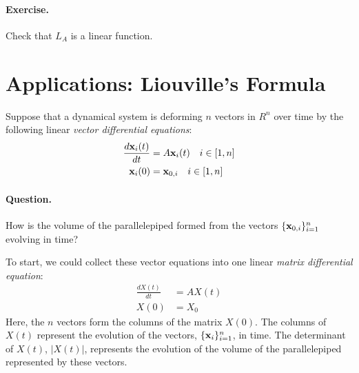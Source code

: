 \documentclass{article}
\begin{document}
\paragraph{Exercise.} Check that $L_A$ is a linear function.

\section{Applications: Liouville's Formula}
Suppose that a dynamical system is deforming $n$ vectors in $R^n$ over time by
the following linear {\em vector differential equations\/}:
\begin{align}
  \frac{d {\bf x}_i(t)}{dt} &= A {\bf x}_i(t) \quad i \in [1, n] \label{deq_v}\\
    {\bf x}_i(0) &= {\bf x}_{0,i} \quad i \in [1,n]
\end{align}

\paragraph{Question.} How is the volume of the parallelepiped formed from the vectors $\{{\bf x}_{0,i}\}_{i=1}^n$
evolving in time?

To start, we could collect these vector equations into one linear
{\em matrix differential equation\/}:
\begin{align}
  \frac{d X(t)}{dt} &= A X(t) \label{deq_m}\\
  X(0) &= X_0
\end{align}
Here, the $n$ vectors form the columns of the matrix $X(0)$. The columns of
$X(t)$ represent the evolution of the vectors, $\{{\bf x}_i\}_{i=1}^n$, in time.
The determinant of $X(t)$, $|X(t)|$, represents the evolution of the volume 
of the parallelepiped represented by these vectors.
\end{document}
